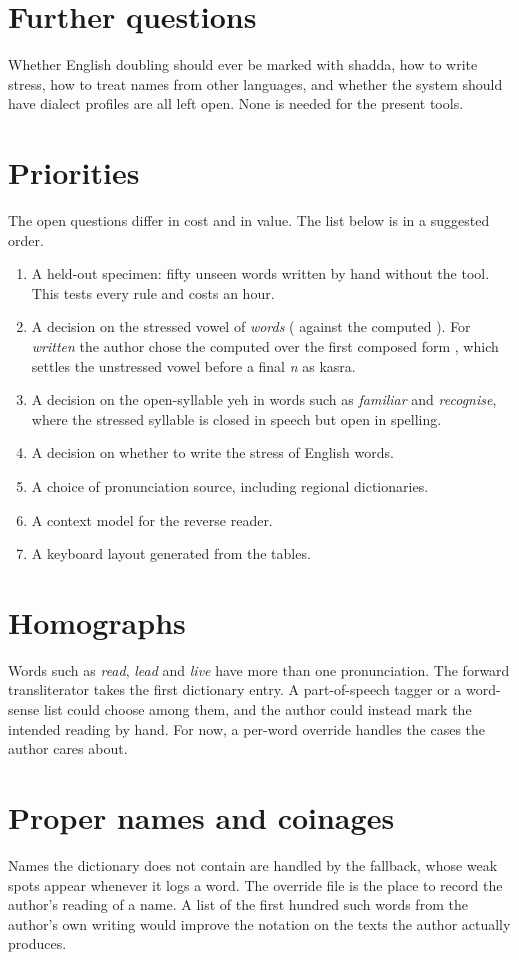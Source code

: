 \section{Further questions}
Whether English doubling should ever be marked with shadda, how to write stress, how to treat names from other languages, and whether the system should have dialect profiles are all left open. None is needed for the present tools.

\section{Priorities}
The open questions differ in cost and in value. The list below is in a suggested order.
\begin{enumerate}
\item A held-out specimen: fifty unseen words written by hand without the tool. This tests every rule and costs an hour.
\item A decision on the stressed vowel of \emph{words} ( against the computed ). For \emph{written} the author chose the computed  over the first composed form , which settles the unstressed vowel before a final \emph{n} as kasra.
\item A decision on the open-syllable yeh in words such as \emph{familiar} and \emph{recognise}, where the stressed syllable is closed in speech but open in spelling.
\item A decision on whether to write the stress of English words.
\item A choice of pronunciation source, including regional dictionaries.
\item A context model for the reverse reader.
\item A keyboard layout generated from the tables.
\end{enumerate}

\section{Homographs}
Words such as \emph{read}, \emph{lead} and \emph{live} have more than one pronunciation. The forward transliterator takes the first dictionary entry. A part-of-speech tagger or a word-sense list could choose among them, and the author could instead mark the intended reading by hand. For now, a per-word override handles the cases the author cares about.

\section{Proper names and coinages}
Names the dictionary does not contain are handled by the fallback, whose weak spots appear whenever it logs a word. The override file is the place to record the author's reading of a name. A list of the first hundred such words from the author's own writing would improve the notation on the texts the author actually produces.

